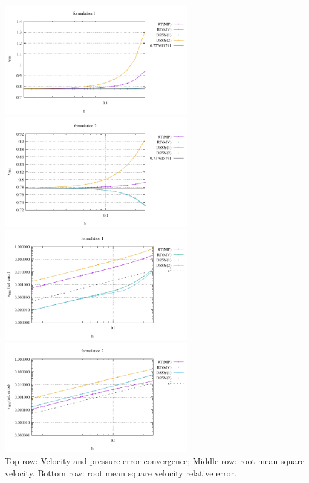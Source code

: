\begin{itemize}
\begin{center}
\includegraphics[width=8cm]{python_codes/fieldstone_77/results/vj/vrms_form1}
\includegraphics[width=8cm]{python_codes/fieldstone_77/results/vj/vrms_form2}\\
\includegraphics[width=8cm]{python_codes/fieldstone_77/results/vj/vrms_form1_relerror}
\includegraphics[width=8cm]{python_codes/fieldstone_77/results/vj/vrms_form2_relerror}\\
{\captionfont Top row: Velocity and pressure error convergence; 
Middle row: root mean square velocity. 
Bottom row: root mean square velocity relative error.}
\end{center}


\end{itemize}

